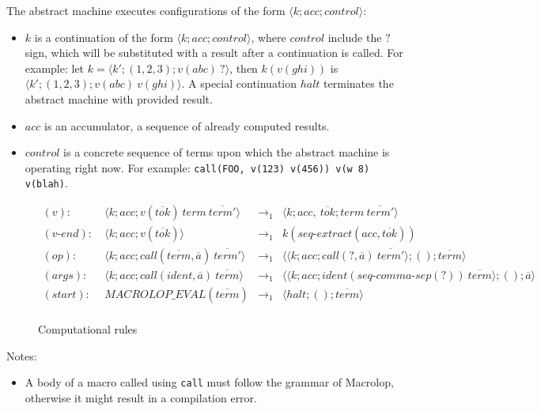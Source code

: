 \documentclass[a4paper, 12pt]{article}
\begin{document}
The abstract machine executes configurations of the form $\langle k; acc; control \rangle$:

\begin{itemize}
    \item $k$ is a continuation of the form $\langle k; acc; control \rangle$, where
    $control$ include the $?$ sign, which will be substituted with a result after a
    continuation is called. For example: let $k = \langle k'; (1, 2, 3); v(abc) \ ? \rangle$,
    then $k(v(ghi))$ is $\langle k'; (1, 2, 3); v(abc) \ v(ghi) \rangle$. A special
    continuation $halt$ terminates the abstract machine with provided result.

    \item $acc$ is an accumulator, a sequence of already computed results.

    \item $control$ is a concrete sequence of terms upon which the abstract machine is
    operating right now. For example: \texttt{call(FOO, v(123) v(456)) v(w 8) v(blah)}.
\end{itemize}

\begin{figure}[H]
    \caption{Computational rules}

    \begin{align*}
        (v): \ & \langle k; acc; v(\overline{tok}) \ term \ \overline{term'} \rangle & \to_1 &
            \langle k; acc, \ \overline{tok}; term \ \overline{term'} \rangle \\
        (v\mbox{-}end): \ & \langle k; acc; v(\overline{tok}) \rangle & \to_1 &
            k(seq\mbox{-}extract(acc, \overline{tok})) \\
        (op): \ & \langle k; acc; call(\overline{term}, \overline{a}) \ \overline{term'} \rangle & \to_1 &
            \langle \langle k; acc; call(?, \overline{a}) \ \overline{term'} \rangle; (); \overline{term} \rangle \\
        (args): \ & \langle k; acc; call(ident, \overline{a}) \ \overline{term} \rangle & \to_1 &
            \langle \langle k; acc; ident(seq\mbox{-}comma\mbox{-}sep(?)) \ \overline{term} \rangle; (); \overline{a} \rangle \\
        (start): \ & MACROLOP\_EVAL(\overline{term}) & \to_1 &
            \langle halt; (); \overline{term} \rangle \\
    \end{align*}
\end{figure}

Notes:

\begin{itemize}
    \item A body of a macro called using \texttt{call} must follow the grammar of
    Macrolop, otherwise it might result in a compilation error.
\end{itemize}
\end{document}
